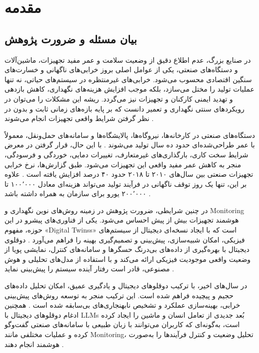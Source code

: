 \chapter{مقدمه}  
  
  
  \section{بیان مسئله و ضرورت پژوهش}
  
  در صنایع بزرگ، عدم اطلاع دقیق از وضعیت سلامت و عمر مفید تجهیزات، ماشین‌آلات و دستگاه‌های صنعتی، یکی از عوامل اصلی بروز خرابی‌های ناگهانی و خسارت‌های سنگین اقتصادی محسوب می‌شود. خرابی‌های غیرمنتظره در سیستم‌های حیاتی، نه تنها عملیات تولید را مختل می‌سازد، بلکه موجب افزایش هزینه‌های نگهداری، کاهش بازدهی و تهدید ایمنی کارکنان و تجهیزات نیز می‌گردد. ریشه این مشکلات را می‌توان در رویکردهای سنتی نگهداری و تعمیر دانست که بر پایه بازه‌های زمانی ثابت و بدون در نظر گرفتن شرایط واقعی تجهیزات انجام می‌شوند \cite{ismail2025systematic}.
  
دستگاه‌های صنعتی در کارخانه‌ها، نیروگاه‌ها، پالایشگاه‌ها و سامانه‌های حمل‌ونقل، معمولاً با عمر طراحی‌شده‌ای حدود ده سال تولید می‌شوند \cite{aivaliotis2021degradation}. با این حال، قرار گرفتن در معرض شرایط سخت کاری، بارگذاری‌های غیرمتعارف، تغییرات دمایی، خوردگی و فرسودگی، منجر به کاهش عمر مفید واقعی این تجهیزات می‌شود. طبق گزارش‌ها، نرخ خرابی تجهیزات صنعتی بین سال‌های ۲۰۱۰ تا ۲۰۱۸ حدود ۴۰ درصد افزایش یافته است \cite{corchado2019failure}. علاوه بر این، تنها یک روز توقف ناگهانی در فرآیند تولید می‌تواند هزینه‌ای معادل ۱۰۰٬۰۰۰ تا ۲۰۰٬۰۰۰ یورو برای سازمان به همراه داشته باشد \cite{mathur2001reasoning}.
  
در چنین شرایطی، ضرورت پژوهش در زمینه روش‌های نوین نگهداری و \gls{Monitoring} هوشمند تجهیزات بیش از پیش احساس می‌شود. یکی از فناوری‌های پیشرو در این حوزه، مفهوم «\glspl{Digital Twins}» است که با ایجاد نسخه‌ای دیجیتال از سیستم‌های فیزیکی، امکان شبیه‌سازی، پیش‌بینی و تصمیم‌گیری بهینه را فراهم می‌آورد \cite{tao2019digital}. دوقلوی دیجیتال با بهره‌گیری از داده‌های بی‌درنگ حسگرها و سامانه‌های کنترل، نمایشی پویا از وضعیت واقعی موجودیت فیزیکی ارائه می‌کند و با استفاده از مدل‌های تحلیلی و هوش مصنوعی، قادر است رفتار آینده سیستم را پیش‌بینی نماید \cite{vandinter2022predictive}.  
  
در سال‌های اخیر، با ترکیب دوقلوهای دیجیتال و یادگیری عمیق، امکان تحلیل داده‌های حجیم و پیچیده فراهم شده است. این ترکیب منجر به توسعه روش‌های پیش‌بینی خرابی، بهینه‌سازی عملکرد و تشخیص نابهنجاری‌های بی‌سابقه شده است \cite{lv2024artificial, kreuzer2024artificial}. همچنین ادغام دوقلوهای دیجیتال با \glspl{LLM} بُعد جدیدی از تعامل انسان و ماشین را ایجاد کرده است، به‌گونه‌ای که کاربران می‌توانند با زبان طبیعی با سامانه‌های صنعتی گفت‌وگو کرده و عملیات مختلفی مانند \gls{Monitoring}، تحلیل وضعیت و کنترل فرآیندها را به‌صورت هوشمند انجام دهند \cite{CHEN2025102982LLMDT}.
  
